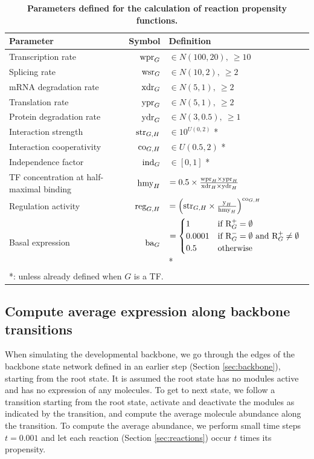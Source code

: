 \begin{table}[h]
	\caption{\textbf{Parameters defined for the calculation of reaction propensity functions.}} \label{tab:reaction_params}
	\centering
	\begin{tabular}{|lrl|}
		\hline
		Parameter & Symbol & Definition \\ \hline \hline
		Transcription rate & $\text{wpr}_{G}$ & $\in N(100, 20),\ \geq 10$ \\
		Splicing rate & $\text{wsr}_{G}$ & $\in N(10, 2),\ \geq 2$ \\
		mRNA degradation rate & $\text{xdr}_{G}$ & $\in N(5, 1),\ \geq 2$ \\
		Translation rate & $\text{ypr}_{G}$ & $\in N(5, 1),\ \geq 2$ \\
		Protein degradation rate & $\text{ydr}_{G}$ & $\in N(3, 0.5),\ \geq 1$ \\
		Interaction strength & $\text{str}_{G,H}$ & $\in 10^{U(0, 2)}$ * \\ 
		Interaction cooperativity & $\text{co}_{G,H}$ & $\in U(0.5, 2)$ * \\
    Independence factor & $\text{ind}_{G}$ & $\in [0, 1]$ * \\ \hline\hline
		TF concentration at half-maximal binding & $\text{hmy}_{H}$ & $= 0.5 \times \frac{\text{wpr}_{H} \times \text{ypr}_{H}}{\text{xdr}_{H} \times \text{ydr}_{H}}$ \\ 
		Regulation activity & $\text{reg}_{G,H}$ & $= \left(\text{str}_{G,H} \times \frac{\text{y}_{H}}{\text{hmy}_{H}}\right) ^ {\text{co}_{G,H}}$ \\
		Basal expression & $\text{ba}_{G}$ & $= \begin{cases} 1 & \mbox{if } \text{R}^+_{G} = \emptyset \\ 0.0001 & \mbox{if } \text{R}^-_{G} = \emptyset \mbox{ and } \text{R}^+_{G} \neq \emptyset \\ 0.5 & \mbox{otherwise} \end{cases}$ * \\ \hline
		\multicolumn{3}{l}{*: unless already defined when $G$ is a TF.}
	\end{tabular}
\end{table}

\subsection{Compute average expression along backbone transitions} \label{sec:dyngen_sim_backbone}

When simulating the developmental backbone, we go through the edges of the backbone state network defined in an earlier step (Section \ref{sec:backbone}), starting from the root state. It is assumed the root state has no modules active and has no expression of any molecules. To get to next state, we follow a transition starting from the root state, activate and deactivate the modules as indicated by the transition, and compute the average molecule abundance along the transition. To compute the average abundance, we perform small time steps $t = 0.001$ and let each reaction (Section \ref{sec:reactions}) occur $t$ times its propensity. 

